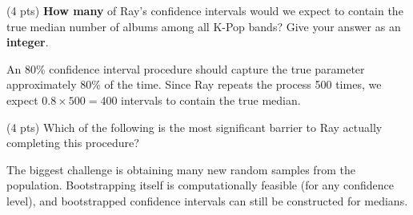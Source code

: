 \documentclass[twoside,12pt]{article}
\begin{document}
\begin{probset}
\begin{prob}[(8 pts)]
\begin{subprobset}

\begin{subprob}(4 pts) \textbf{How many} of Ray's confidence intervals would we expect to contain the true median number of albums among all K-Pop bands? Give your answer as an \textbf{integer}.

\smallskip

\begin{center}
\end{center}

\begin{soln}
An 80\% confidence interval procedure should capture the true parameter approximately 80\% of the time. Since Ray repeats the process 500 times, we expect $0.8 \times 500 = 400$ intervals to contain the true median.
\end{soln}

\end{subprob}

\bigskip

\begin{subprob}(4 pts)
Which of the following is the most significant barrier to Ray actually completing this procedure?

\smallskip
{}

\smallskip
{}

\smallskip
{}

\smallskip
{}

\begin{soln}
The biggest challenge is obtaining many new random samples from the population. Bootstrapping itself is computationally feasible (for any confidence level), and bootstrapped confidence intervals can still be constructed for medians.
\end{soln}

\end{subprob}

\end{subprobset}

\end{prob}

\newpage


\end{probset}
\end{document}
